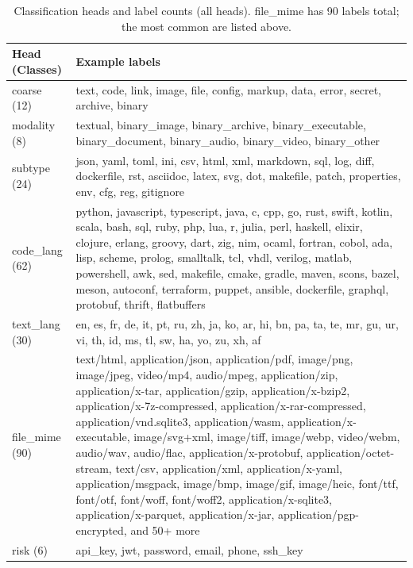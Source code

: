 \documentclass[11pt,a4paper]{article}
\begin{document}
\begin{table}[h]
\centering
\small
\begin{tabular}{lp{10.5cm}}
\toprule
Head (Classes) & Example labels \\
\midrule
coarse (12)    & text, code, link, image, file, config, markup, data, error, secret, archive, binary \\
modality (8)   & textual, binary\_image, binary\_archive, binary\_executable, binary\_document, binary\_audio, binary\_video, binary\_other \\
subtype (24)   & json, yaml, toml, ini, csv, html, xml, markdown, sql, log, diff, dockerfile, rst, asciidoc, latex, svg, dot, makefile, patch, properties, env, cfg, reg, gitignore \\
code\_lang (62) & python, javascript, typescript, java, c, cpp, go, rust, swift, kotlin, scala, bash, sql, ruby, php, lua, r, julia, perl, haskell, elixir, clojure, erlang, groovy, dart, zig, nim, ocaml, fortran, cobol, ada, lisp, scheme, prolog, smalltalk, tcl, vhdl, verilog, matlab, powershell, awk, sed, makefile, cmake, gradle, maven, scons, bazel, meson, autoconf, terraform, puppet, ansible, dockerfile, graphql, protobuf, thrift, flatbuffers \\
text\_lang (30) & en, es, fr, de, it, pt, ru, zh, ja, ko, ar, hi, bn, pa, ta, te, mr, gu, ur, vi, th, id, ms, tl, sw, ha, yo, zu, xh, af \\
file\_mime (90) & text/html, application/json, application/pdf, image/png, image/jpeg, video/mp4, audio/mpeg, application/zip, application/x-tar, application/gzip, application/x-bzip2, application/x-7z-compressed, application/x-rar-compressed, application/vnd.sqlite3, application/wasm, application/x-executable, image/svg+xml, image/tiff, image/webp, video/webm, audio/wav, audio/flac, application/x-protobuf, application/octet-stream, text/csv, application/xml, application/x-yaml, application/msgpack, image/bmp, image/gif, image/heic, font/ttf, font/otf, font/woff, font/woff2, application/x-sqlite3, application/x-parquet, application/x-jar, application/pgp-encrypted, and 50+ more \\
risk (6)       & api\_key, jwt, password, email, phone, ssh\_key \\
\bottomrule
\end{tabular}
\caption{\label{tab:heads} Classification heads and label counts (all heads). file\_mime has 90 labels total; the most common are listed above.}
\end{table}
\end{document}
